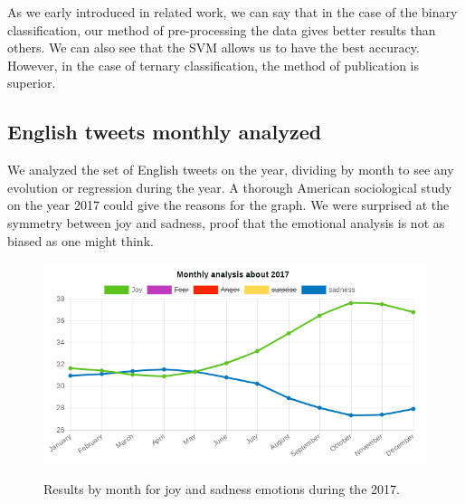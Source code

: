 \documentclass{acmtog} %
\begin{document}
\begin{table}[H]
\label{tab:binary}
\end{table}

As we early introduced in related work, we can say that in the case of the binary classification, our method of pre-processing the data gives better results than others.
We can also see that the SVM allows us to have the best accuracy.
However, in the case of ternary classification, the method of publication is superior.

\subsection{English tweets monthly analyzed}
\label{subsub:english_tweets_monthly}

We analyzed the set of English tweets on the year, dividing by month to see any evolution or regression during the year. A thorough American sociological study on the year 2017 could give the reasons for the graph. We were surprised at the symmetry between joy and sadness, proof that the emotional analysis is not as biased as one might think. 

\begin{figure}[H]
{\includegraphics[width=\linewidth]{monthly_analysis_joy_sadness-exemple.png}}
\caption{Results by month for joy and sadness emotions during the 2017.}
  \label{fig:trump_results}
\end{figure}
\end{document}
